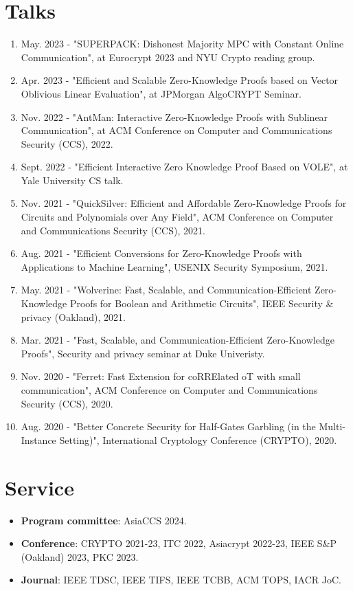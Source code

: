 \documentclass[letterpaper,11pt]{article}
\newcommand{\resumeSubHeadingListStart}{\begin{itemize}[leftmargin=0.15in, label={}]}
\begin{document}
\section{Talks}
\begin{enumerate}[leftmargin=0.20in]
  \item
    \small May. 2023 - "SUPERPACK: Dishonest Majority MPC with Constant Online Communication", at Eurocrypt 2023 and NYU Crypto reading group.
  \item
    \small Apr. 2023 - "Efficient and Scalable Zero-Knowledge Proofs based on Vector Oblivious Linear Evaluation", at JPMorgan AlgoCRYPT Seminar.
  \item
	  \small Nov. 2022 - "AntMan: Interactive Zero-Knowledge Proofs with Sublinear Communication", at ACM Conference on Computer and Communications Security (CCS), 2022.
  \item
	  \small Sept. 2022 - "Efficient Interactive Zero Knowledge Proof Based on VOLE", at Yale University CS talk.
  \item
	  \small Nov. 2021 - "QuickSilver: Efficient and Affordable Zero-Knowledge Proofs for Circuits and Polynomials over Any Field", ACM Conference on Computer and Communications Security (CCS), 2021.
  \item
	  \small Aug. 2021 - "Efficient Conversions for Zero-Knowledge Proofs with Applications to Machine Learning", USENIX Security Symposium, 2021.
  \item
	  \small May. 2021 - "Wolverine: Fast, Scalable, and Communication-Efficient Zero-Knowledge Proofs for Boolean and Arithmetic Circuits", IEEE Security \& privacy (Oakland), 2021.
  \item
	  \small Mar. 2021 - "Fast, Scalable, and Communication-Efficient Zero-Knowledge Proofs", Security and privacy seminar at Duke Univeristy.
  \item
          \small Nov. 2020 - "Ferret: Fast Extension for coRRElated oT with small communication", ACM Conference on Computer and Communications Security (CCS), 2020.
  \item
          \small Aug. 2020 - "Better Concrete Security for Half-Gates Garbling (in the Multi-Instance Setting)", International Cryptology Conference (CRYPTO), 2020.
\end{enumerate}

\section{Service}
\begin{itemize}[leftmargin=0.15in, label={}]
  \item \textbf{Program committee}: AsiaCCS 2024.
  \item \textbf{Conference}: CRYPTO 2021-23, ITC 2022, Asiacrypt 2022-23, IEEE S\&P (Oakland) 2023, PKC 2023.
    \item \textbf{Journal}: IEEE TDSC, IEEE TIFS, IEEE TCBB, ACM TOPS, IACR JoC.
\end{itemize}
%
\end{document}
